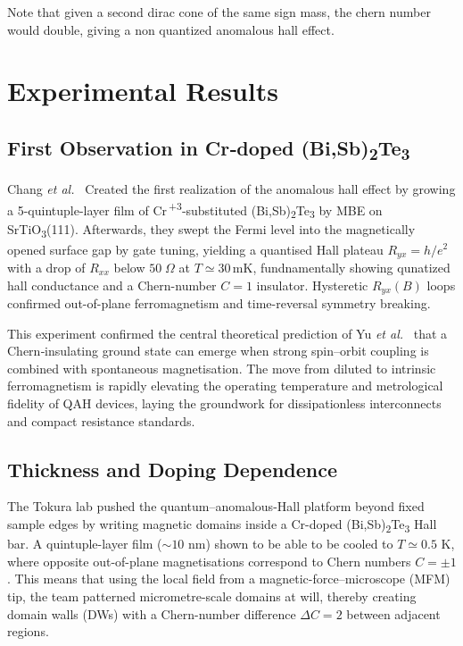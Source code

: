 \documentclass[aps,prb,twocolumn]{revtex4-2}
\begin{document}
    Note that given a second dirac cone of the same sign mass, the chern number would double, giving a non quantized anomalous hall effect.

  \section{Experimental Results}
    \subsection{First Observation in Cr‐doped (Bi,Sb)\texorpdfstring{\textsubscript{2}}{₂}Te\texorpdfstring{\textsubscript{3}}{₃}}
      Chang \emph{et al.}\ \cite{chang_experimental_2013} Created the first realization of the anomalous hall effect by growing a 5-quintuple-layer film of Cr\textsuperscript{\,+3}‐substituted (Bi,Sb)\textsubscript{2}Te\textsubscript{3} by MBE on SrTiO\textsubscript{3}(111). Afterwards, they swept the Fermi level into the magnetically opened surface gap by gate tuning, yielding a quantised Hall plateau $R_{yx}=h/e^{2}$ with a drop of $R_{xx}$ below $50\;\Omega$ at $T \simeq 30\,$mK, fundnamentally showing qunatized hall conductance and a Chern-number $C=1$ insulator.  Hysteretic $R_{yx}(B)$ loops confirmed out-of-plane ferromagnetism and time-reversal symmetry breaking.

     This experiment confirmed the central theoretical prediction of Yu \emph{et al.}\ \cite{yu_quantized_2010} that a Chern‐insulating ground state can emerge when strong spin–orbit coupling is combined with spontaneous magnetisation.  The move from diluted to intrinsic ferromagnetism is rapidly elevating the operating temperature and metrological fidelity of QAH devices, laying the groundwork for dissipationless interconnects and compact resistance standards.

    \subsection{Thickness and Doping Dependence}
    The Tokura lab \cite{yasuda_quantized_2017} pushed the quantum–anomalous-Hall platform beyond fixed sample edges by writing magnetic domains inside a Cr-doped (Bi,Sb)\textsubscript{2}Te\textsubscript{3} Hall bar. A quintuple-layer film ($\sim\!10$ nm) shown to be able to be cooled to $T\simeq0.5$ K, where opposite out-of-plane magnetisations correspond to Chern numbers $C=\pm1$. This means that using the local field from a magnetic-force–microscope (MFM) tip, the team patterned micrometre-scale domains at will, thereby creating domain walls (DWs) with a Chern-number difference $\Delta C = 2$ between adjacent regions.
    
\end{document}
